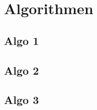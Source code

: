 \chapter{Algorithmen}
\label{cha:algorithmen}

\section{Algo 1}

\section{Algo 2}

\section{Algo 3}
